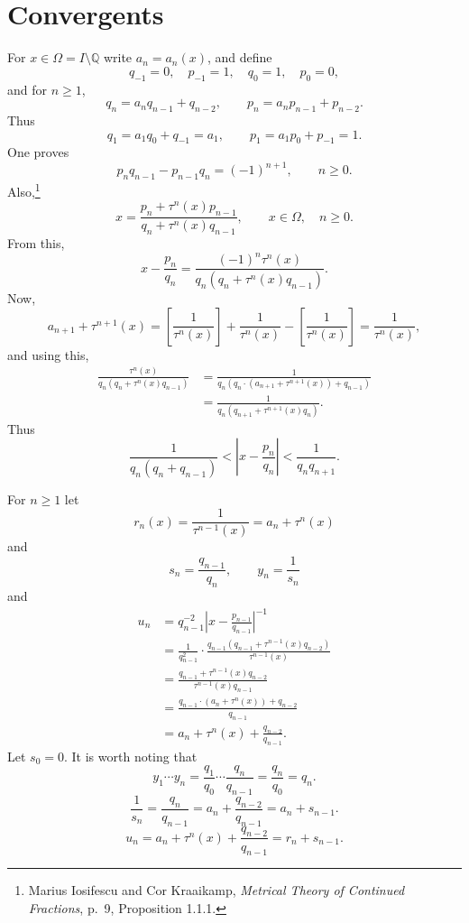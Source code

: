 \documentclass{article}
\theoremstyle{definition}
\begin{document}
\section{Convergents}
For $x \in \Omega = I \setminus \mathbb{Q}$ write $a_n=a_n(x)$, and define
\[
q_{-1}=0,\quad p_{-1}=1,\quad q_0=1,\quad p_0=0,
\]
and for $n \geq 1$,
\[
q_n=a_n q_{n-1}+q_{n-2},\qquad p_n=a_np_{n-1}+p_{n-2}.
\]
Thus
\[
q_1 = a_1 q_0+q_{-1} = a_1,\qquad p_1 = a_1 p_0+p_{-1} = 1.
\]
One proves
\[
p_nq_{n-1}-p_{n-1}q_n=(-1)^{n+1},\qquad n \geq 0.
\]
Also,\footnote{Marius Iosifescu and Cor Kraaikamp,
{\em Metrical Theory of Continued Fractions}, p.~9, Proposition 1.1.1.}
\[
x = \frac{p_n+\tau^n(x) p_{n-1}}{q_n+\tau^n(x) q_{n-1}},\qquad x \in \Omega,\quad n \geq 0.
\]
From this,
\[
x - \frac{p_n}{q_n} = \frac{(-1)^n \tau^n(x)}{q_n(q_n+\tau^n(x) q_{n-1})}.
\]
Now,
\[
a_{n+1} + \tau^{n+1}(x) = \left[\frac{1}{\tau^n(x)} \right] + \frac{1}{\tau^n(x)} - \left[\frac{1}{\tau^n(x)} \right]
=\frac{1}{\tau^n(x)},
\]
and using this,
\begin{align*}
 \frac{\tau^n(x)}{q_n(q_n+\tau^n(x) q_{n-1})}&= \frac{1}{q_n(q_n \cdot (a_{n+1} + \tau^{n+1}(x))+q_{n-1})}\\
 &=\frac{1}{q_n(q_{n+1}+\tau^{n+1}(x) q_n)}.
\end{align*}
Thus
\[
\frac{1}{q_n(q_n+q_{n-1})} < \left| x - \frac{p_n}{q_n} \right| < \frac{1}{q_n q_{n+1}}.
\]

For $n \geq 1$ let 
\[
r_n(x) = \frac{1}{\tau^{n-1}(x)}=a_n+\tau^n(x)
\]
and
\[
s_n = \frac{q_{n-1}}{q_n},\qquad y_n=\frac{1}{s_n}
\]
and
\begin{align*}
u_n &= q_{n-1}^{-2} \left|x-\frac{p_{n-1}}{q_{n-1}}\right|^{-1}\\
&=\frac{1}{q_{n-1}^2} \cdot \frac{q_{n-1}(q_{n-1}+\tau^{n-1}(x) q_{n-2})}{\tau^{n-1}(x)}\\
&=\frac{q_{n-1}+\tau^{n-1}(x)q_{n-2}}{\tau^{n-1}(x) q_{n-1}}\\
&=\frac{q_{n-1} \cdot (a_n+\tau^n(x)) + q_{n-2}}{q_{n-1}}\\
&=a_n+\tau^n(x) + \frac{q_{n-2}}{q_{n-1}}.
\end{align*}
Let $s_0=0$.
It is worth noting that
\[
y_1 \cdots y_n = \frac{q_1}{q_0} \cdots \frac{q_n}{q_{n-1}} = \frac{q_n}{q_0} = q_n.
\]
\[
\frac{1}{s_n} = \frac{q_n}{q_{n-1}} = a_n + \frac{q_{n-2}}{q_{n-1}} = a_n + s_{n-1}.
\]
\[
u_n = a_n+\tau^n(x) + \frac{q_{n-2}}{q_{n-1}} = r_n + s_{n-1}.
\]
\end{document}
